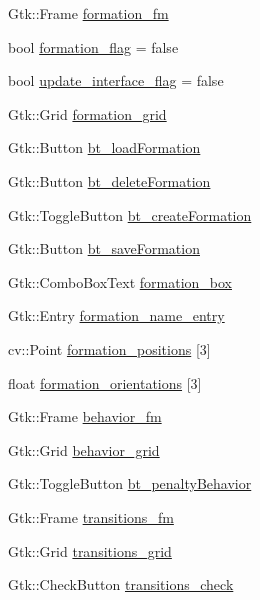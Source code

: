 \begin{DoxyCompactItemize}
\item 
Gtk\+::\+Frame \hyperlink{class_strategy_g_u_i_a1e0acda1bb4132bcb704eaf3bb0434f2}{formation\+\_\+fm}
\item 
bool \hyperlink{class_strategy_g_u_i_aaac145125516fb8b7fe7137db18cdb58}{formation\+\_\+flag} = false
\item 
bool \hyperlink{class_strategy_g_u_i_a83d19a6d98510e3984be7196c740d1fc}{update\+\_\+interface\+\_\+flag} = false
\item 
Gtk\+::\+Grid \hyperlink{class_strategy_g_u_i_a86e01136167ad809807e6341957a850c}{formation\+\_\+grid}
\item 
Gtk\+::\+Button \hyperlink{class_strategy_g_u_i_a89efee7959e39e3c993080d88262521d}{bt\+\_\+load\+Formation}
\item 
Gtk\+::\+Button \hyperlink{class_strategy_g_u_i_acce16be9100c9d09a3a9ca2087b8370b}{bt\+\_\+delete\+Formation}
\item 
Gtk\+::\+Toggle\+Button \hyperlink{class_strategy_g_u_i_ab6edc11fb98709c98ad1815998aa937a}{bt\+\_\+create\+Formation}
\item 
Gtk\+::\+Button \hyperlink{class_strategy_g_u_i_ae68d7475f55a82e46d74eb8b3cd53b9e}{bt\+\_\+save\+Formation}
\item 
Gtk\+::\+Combo\+Box\+Text \hyperlink{class_strategy_g_u_i_a0f2ab3a2cdca1663def9c4ec1e366a5d}{formation\+\_\+box}
\item 
Gtk\+::\+Entry \hyperlink{class_strategy_g_u_i_a19406b76eaf73c06545aa1c67c0636ce}{formation\+\_\+name\+\_\+entry}
\item 
cv\+::\+Point \hyperlink{class_strategy_g_u_i_a4d2d15fe0a25b8d9d8fa56a4cf155ff0}{formation\+\_\+positions} \mbox{[}3\mbox{]}
\item 
float \hyperlink{class_strategy_g_u_i_ad8d7e6bbfceba5d6284c8825f37ea8a2}{formation\+\_\+orientations} \mbox{[}3\mbox{]}
\item 
Gtk\+::\+Frame \hyperlink{class_strategy_g_u_i_a0c1c6c29081524b2f721722867bc0c14}{behavior\+\_\+fm}
\item 
Gtk\+::\+Grid \hyperlink{class_strategy_g_u_i_a705ef10226625c54803a2d47424abd32}{behavior\+\_\+grid}
\item 
Gtk\+::\+Toggle\+Button \hyperlink{class_strategy_g_u_i_ae35ac01a050961304f3cc374e814c9dd}{bt\+\_\+penalty\+Behavior}
\item 
Gtk\+::\+Frame \hyperlink{class_strategy_g_u_i_ab3d47a7a0fb8e1f7e030c4daad0ca8ec}{transitions\+\_\+fm}
\item 
Gtk\+::\+Grid \hyperlink{class_strategy_g_u_i_a1be6ca5d69ec2de3a1349ad480c9eb73}{transitions\+\_\+grid}
\item 
Gtk\+::\+Check\+Button \hyperlink{class_strategy_g_u_i_ad74384d402b07845c2f9632f1382420b}{transitions\+\_\+check}
\end{DoxyCompactItemize}
